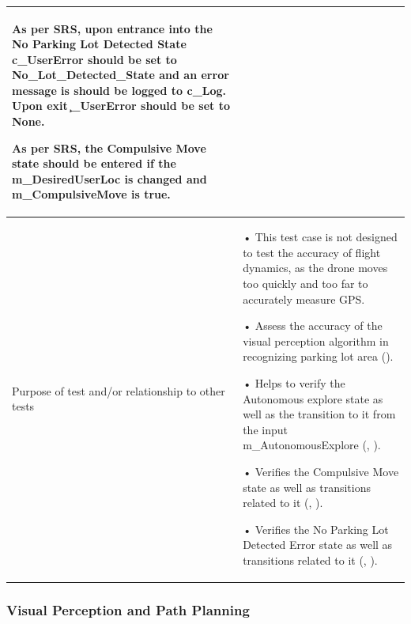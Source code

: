 \documentclass[12pt, titlepage]{article}
\begin{document}
\begin{table}[!h]
\begin{center}
\begin{tabular}{ | m{1.5cm} | m{15cm} | }
As per SRS, upon entrance into the No Parking Lot Detected State c\_UserError should be set to No_Lot_Detected_State and an error message is should be logged to c\_Log. Upon exit \c_UserError should be set to None.

As per SRS, the Compulsive Move state should be entered if the m\_DesiredUserLoc is changed and m\_CompulsiveMove is true. 
 \\ 
\hline
Purpose of test and/or relationship to other tests & 
• This test case is not designed to test the accuracy of flight dynamics, as the drone moves too quickly and too far to accurately measure GPS.

• Assess the accuracy of the visual perception algorithm in recognizing parking lot area (\nameref{GEN_001}).

• Helps to verify the Autonomous explore state as well as the transition to it from the input m\_AutonomousExplore (\nameref{STA_003}, \nameref{TRANS_004}). 

• Verifies the Compulsive Move state as well as transitions related to it (\nameref{STA_011}, \nameref{TRANS_012}).

• Verifies the No Parking Lot Detected Error state as well as transitions related to it (\nameref{STA_008}, \nameref{TRANS_008}).
\\ 
\hline
\end{tabular}
\end{center}
\end{table}

\clearpage

\subsubsection{Visual Perception and Path Planning}
\end{document}

